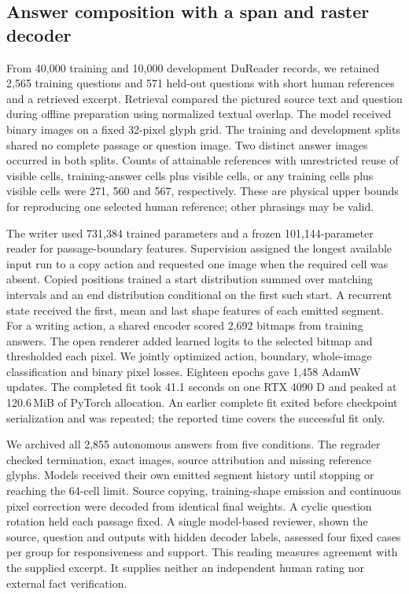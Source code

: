 \documentclass[12pt,a4paper]{article}
\providecommand{\DIFadd}[1]{{\protect\color{blue} \sf #1}} %
\begin{document}
\subsection*{\DIFadd{Answer composition with a span and raster decoder}}
\DIFadd{From 40,000 training and 10,000 development DuReader records, we retained 2,565 training questions and 571 held-out questions with short human references and a retrieved excerpt. Retrieval compared the pictured source text and question during offline preparation using normalized textual overlap. The model received binary images on a fixed 32-pixel glyph grid. The training and development splits shared no complete passage or question image. Two distinct answer images occurred in both splits. Counts of attainable references with unrestricted reuse of visible cells, training-answer cells plus visible cells, or any training cells plus visible cells were 271, 560 and 567, respectively. These are physical upper bounds for reproducing one selected human reference; other phrasings may be valid.
}

\DIFadd{The writer used 731,384 trained parameters and a frozen 101,144-parameter reader for passage-boundary features. Supervision assigned the longest available input run to a copy action and requested one image when the required cell was absent. Copied positions trained a start distribution summed over matching intervals and an end distribution conditional on the first such start. A recurrent state received the first, mean and last shape features of each emitted segment. For a writing action, a shared encoder scored 2,692 bitmaps from training answers. The open renderer added learned logits to the selected bitmap and thresholded each pixel. We jointly optimized action, boundary, whole-image classification and binary pixel losses. Eighteen epochs gave 1,458 AdamW updates. The completed fit took 41.1 seconds on one RTX 4090 D and peaked at 120.6\,MiB of PyTorch allocation. An earlier complete fit exited before checkpoint serialization and was repeated; the reported time covers the successful fit only.
}

\DIFadd{We archived all 2,855 autonomous answers from five conditions. The regrader checked termination, exact images, source attribution and missing reference glyphs. Models received their own emitted segment history until stopping or reaching the 64-cell limit. Source copying, training-shape emission and continuous pixel correction were decoded from identical final weights. A cyclic question rotation held each passage fixed. A single model-based reviewer, shown the source, question and outputs with hidden decoder labels, assessed four fixed cases per group for responsiveness and support. This reading measures agreement with the supplied excerpt. It supplies neither an independent human rating nor external fact verification.
}
\end{document}
